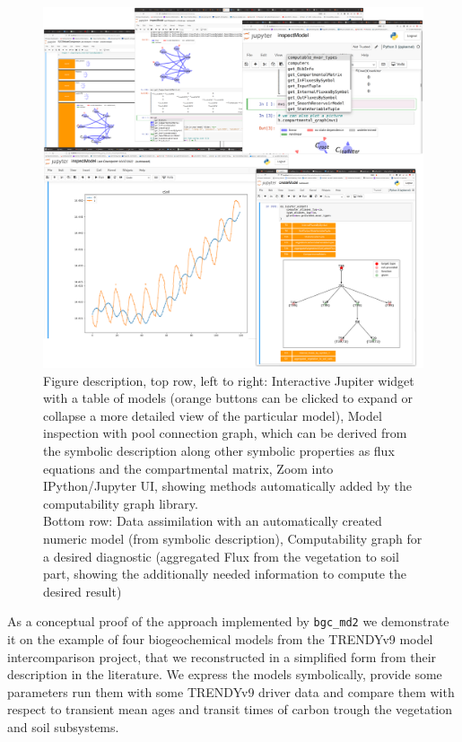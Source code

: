 \begin{figure}[h]
\includegraphics[width=\columnwidth]{TabScreenCombined.pdf}
  \caption{
      Figure description, top row, left to right: Interactive Jupiter widget
      with a table of models (orange buttons can be clicked to expand or
      collapse a more detailed view of the particular model), Model inspection
      with pool connection graph, which can be derived from the symbolic
      description along other symbolic properties as flux equations and the
      compartmental matrix, Zoom into IPython/Jupyter UI, showing methods
      automatically added by the computability graph library.  \\ Bottom row:
      Data assimilation with an automatically created numeric model (from
      symbolic description), Computability graph for a desired diagnostic
      (aggregated Flux from the vegetation to soil part, showing the
      additionally needed information to compute the desired result)
  }
  \label{fig:overview}
\end{figure}

As a conceptual proof of the  approach implemented by \texttt{bgc\_md2}
we demonstrate it on the example of four biogeochemical models from the TRENDYv9 \cite{GCB2020} model intercomparison project, that we reconstructed in a simplified form from their description in the literature.
We express the models symbolically, provide some parameters run them with some TRENDYv9 driver data and
compare them with respect to transient mean ages and transit times of carbon
trough the vegetation and soil subsystems.  

